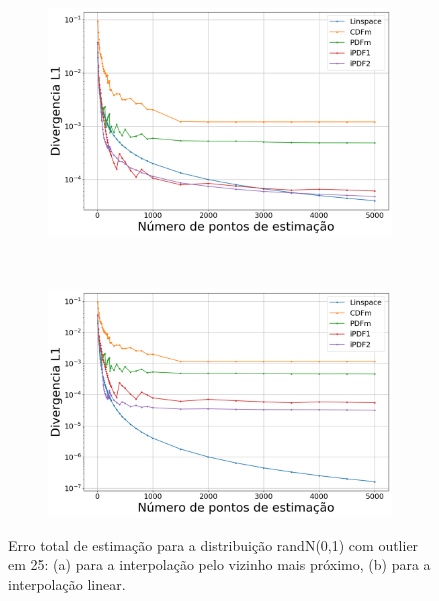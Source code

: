 \begin{figure}[H]
	\centering
	\begin{subfigure}[b]{0.45\textwidth}
		\centering 
		\includegraphics[width=\textwidth]{./figuras/ERRORPLOT_L1_FALSE_NORMAL_NEAREST_100025}
		\caption{}
		\label{fig:error_norm_near_50}
	\end{subfigure}
	\hfill
	~ %
	\begin{subfigure}[b]{0.45\textwidth}
		\centering 
		\includegraphics[width=\textwidth]{./figuras/ERRORPLOT_L1_FALSE_NORMAL_LINEAR_100025}
		\caption{}
		\label{fig:error_norm_lin_50}
	\end{subfigure}
	\caption{Erro total de estimação para a distribuição randN(0,1) com outlier em 25: (a) para a interpolação pelo vizinho mais próximo, (b) para a interpolação linear.}
	\label{fig:Error_out}
\end{figure}